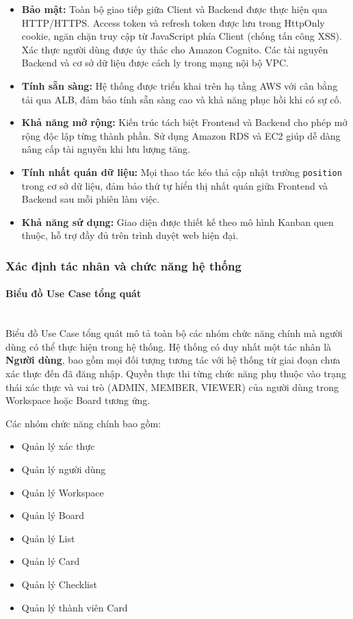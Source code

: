 \begin{itemize}
    \item \textbf{Bảo mật:} Toàn bộ giao tiếp giữa Client và Backend được thực hiện qua HTTP/HTTPS. Access token và refresh token được lưu trong HttpOnly cookie, ngăn chặn truy cập từ JavaScript phía Client (chống tấn công XSS). Xác thực người dùng được ủy thác cho Amazon Cognito. Các tài nguyên Backend và cơ sở dữ liệu được cách ly trong mạng nội bộ VPC.
    \item \textbf{Tính sẵn sàng:} Hệ thống được triển khai trên hạ tầng AWS với cân bằng tải qua ALB, đảm bảo tính sẵn sàng cao và khả năng phục hồi khi có sự cố.
    \item \textbf{Khả năng mở rộng:} Kiến trúc tách biệt Frontend và Backend cho phép mở rộng độc lập từng thành phần. Sử dụng Amazon RDS và EC2 giúp dễ dàng nâng cấp tài nguyên khi lưu lượng tăng.
    \item \textbf{Tính nhất quán dữ liệu:} Mọi thao tác kéo thả cập nhật trường \texttt{position} trong cơ sở dữ liệu, đảm bảo thứ tự hiển thị nhất quán giữa Frontend và Backend sau mỗi phiên làm việc.
    \item \textbf{Khả năng sử dụng:} Giao diện được thiết kế theo mô hình Kanban quen thuộc, hỗ trợ đầy đủ trên trình duyệt web hiện đại.
\end{itemize}

\subsubsection{Xác định tác nhân và chức năng hệ thống}

\paragraph{Biểu đồ Use Case tổng quát} \mbox{}\\

Biểu đồ Use Case tổng quát mô tả toàn bộ các nhóm chức năng chính mà người dùng có thể thực hiện trong hệ thống. Hệ thống có duy nhất một tác nhân là \textbf{Người dùng}, bao gồm mọi đối tượng tương tác với hệ thống từ giai đoạn chưa xác thực đến đã đăng nhập. Quyền thực thi từng chức năng phụ thuộc vào trạng thái xác thực và vai trò (ADMIN, MEMBER, VIEWER) của người dùng trong Workspace hoặc Board tương ứng.

Các nhóm chức năng chính bao gồm:
\begin{itemize}
    \item Quản lý xác thực
    \item Quản lý người dùng
    \item Quản lý Workspace
    \item Quản lý Board
    \item Quản lý List
    \item Quản lý Card
    \item Quản lý Checklist
    \item Quản lý thành viên Card
\end{itemize}

